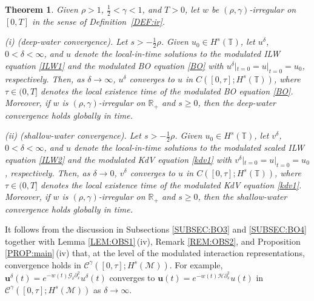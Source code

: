\documentclass[letterpaper, 11pt,  reqno]{amsart}
\newtheorem{theorem}{Theorem} [section]
\newcommand{\1}{\hspace{0.5mm}\text{I}\hspace{0.5mm}}
\newcommand{\noi}{\noindent}
\newcommand{\R}{\mathbb{R}}
\newcommand{\T}{\mathbb{T}}
\renewcommand{\H}{\mathcal{H}}
\newcommand{\CC}{\mathcal{C}}
\newcommand{\dl}{\delta}
\newcommand{\g}{\gamma}
\newcommand{\dx}{\partial_x}
\newcommand{\Gdl}{\mathcal{G}_{\dl} }
\newcommand{\M}{\mathcal{M}}
\newcommand{\uu}{\mathbf{u}}
\numberwithin{equation}{section}
\numberwithin{theorem}{section}
\begin{document}
\begin{theorem}
\label{THM:conv}
Given $\rho >   1$,  $\frac12< \g < 1$, and $T> 0$, 
let  $w$ be $(\rho,\g)$-irregular on $[0, T]$ in the sense of Definition~\ref{DEF:ir}.






\smallskip

\noi
\textup{(i) (deep-water convergence).}
Let 
$s > - \frac 12 \rho$.
Given $u_0 \in H^s (\T)$,
let $u^\dl$, $0<   \dl < \infty$,  and $u$ denote the local-in-time solutions
to the modulated ILW equation \eqref{ILW1}
and the modulated BO equation \eqref{BO}
with $u^\dl|_{t = 0} = u|_{t = 0} = u_0$, respectively.
Then, as $\dl \to \infty$, 
$u^\dl$ converges to $u$ in 
$C([0, \tau]; H^s(\T))$, 
where $\tau \in (0,  T]$ denotes the local existence time of the modulated BO equation
\eqref{BO}.
Moreover, if 
  $w$ is $(\rho,\g)$-irregular on $\R_+$ 
and 
 $s \ge 0 $, 
then the deep-water convergence holds globally in time.


\smallskip

\noi
\textup{(ii) (shallow-water convergence).}
Let 
$s > - \frac 12 \rho$.
Given $u_0 \in H^s (\T)$,
let $v^\dl$, $0<   \dl < \infty$,  and $u$ denote the local-in-time solutions
to the modulated scaled ILW equation \eqref{ILW2}
and the modulated KdV equation \eqref{kdv1}
with $v^\dl|_{t = 0} = u|_{t = 0} = u_0$, respectively.
Then, as $\dl \to 0$, 
$v^\dl$ converges to $u$ in 
$C([0, \tau]; H^s(\T))$, 
where $\tau \in (0, T]$ denotes the local existence time of the modulated KdV equation
\eqref{kdv1}.
Moreover, if 
  $w$ is $(\rho,\g)$-irregular on $\R_+$ 
and 
 $s \ge 0 $, 
then the shallow-water convergence holds globally in time.

\end{theorem}


It follows from 
the discussion in 
Subsections \ref{SUBSEC:BO3}
and \ref{SUBSEC:BO4}
together with 
Lemma \ref{LEM:OBS1}\,(iv), 
Remark \ref{REM:OBS2}, 
and 
Proposition \ref{PROP:main}\,(iv)
that, at the level of the modulated interaction representations, 
convergence holds
in  $\CC^\g([0, \tau]; H^s(\M))$.
For example, 
$\uu^\dl(t) = e^{-  w(t) \Gdl \dx^2} u^\dl(t)$
converges
to $\uu(t) = e^{ -w(t) \H \dx^2} u(t)$
in  $\CC^\g([0, \tau]; H^s(\M))$
as $\dl \to \infty$.
\end{document}
